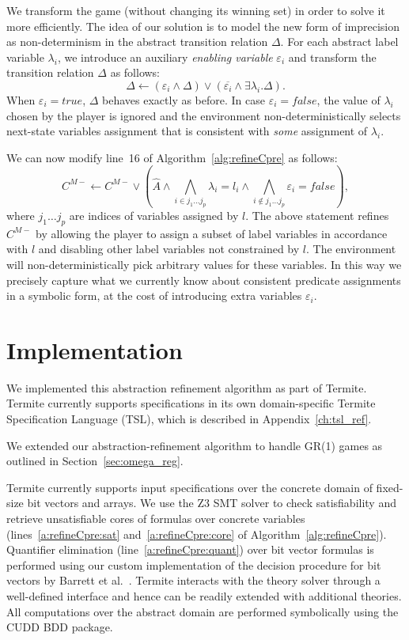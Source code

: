 We transform the game (without changing its winning set) in order to solve it more efficiently.  The idea of our solution is to model the new form of imprecision as non-determinism in the abstract transition relation $\Delta$.  For each abstract label variable $\lambda_i$, we introduce an auxiliary \emph{enabling variable} $\varepsilon_i$ and transform the transition relation $\Delta$ as follows:
$$
\Delta \gets (\varepsilon_i \land \Delta) \lor (\overline{\varepsilon_i} \land \exists \lambda_i. \Delta).
$$
When $\varepsilon_i=true$, $\Delta$ behaves exactly as before.  In case $\varepsilon_i=false$, the value of $\lambda_i$ chosen by the player is ignored and the environment non-deterministically selects next-state variables assignment that is consistent with \emph{some} assignment of $\lambda_i$. 

We can now modify line~16 of Algorithm~\ref{alg:refineCpre} as follows:
$$
C^{M-} \gets C^{M-} \lor (\hat{A}\land \bigwedge_{i\in{j_1\ldots j_p}}\lambda_i=l_i \land \bigwedge_{i\not\in{j_1\ldots j_p}}\varepsilon_i=false),
$$
where $j_1\ldots j_p$ are indices of variables assigned by $l$.  The above statement refines $C^{M-}$ by allowing the player to assign a subset of label variables in accordance with $l$ and disabling other label variables not constrained by $l$.  The environment will non-deterministically pick arbitrary values for these variables.  In this way we precisely capture what we currently know about consistent predicate assignments in a symbolic form, at the cost of introducing extra variables $\varepsilon_i$.

\section{Implementation}
We implemented this abstraction refinement algorithm as part of Termite. Termite currently supports specifications in its own domain-specific Termite Specification Language (TSL), which is described in Appendix~\ref{ch:tsl_ref}.

We extended our abstraction-refinement algorithm to handle GR(1) games as outlined in Section~\ref{sec:omega_reg}.

Termite currently supports input specifications over the concrete domain of fixed-size bit vectors and arrays.  We use the Z3 SMT solver to check satisfiability and retrieve unsatisfiable cores of formulas over concrete variables (lines~\ref{a:refineCpre:sat} and~\ref{a:refineCpre:core} of Algorithm~\ref{alg:refineCpre}).  Quantifier elimination (line~\ref{a:refineCpre:quant}) over bit vector formulas is performed using our custom implementation of the decision procedure for bit vectors by Barrett et al.~\cite{Barrett_DL_98}.  Termite interacts with the theory solver through a well-defined interface and hence can be readily extended with additional theories.  All computations over the abstract domain are performed symbolically using the CUDD BDD package.  

